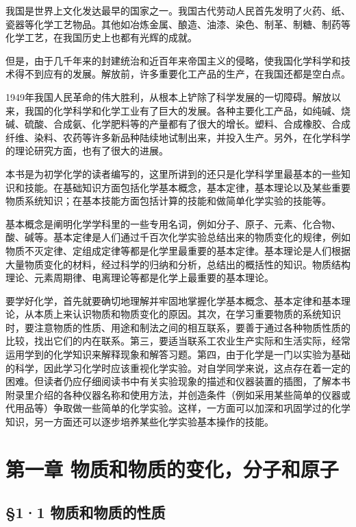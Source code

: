 我国是世界上文化发达最早的国家之一。我国古代劳动人民首先发明了火药、纸、瓷器等化学工艺物品。其他如冶炼金属、酿造、油漆、染色、制革、制糖、制药等化学工艺，在我国历史上也都有光辉的成就。

但是，由于几千年来的封建统治和近百年来帝国主义的侵略，使我国化学科学和技术得不到应有的发展。解放前，许多重要化工产品的生产，在我国还都是空白点。

1949年我国人民革命的伟大胜利，从根本上铲除了科学发展的一切障碍。解放以来，我国的化学科学和化学工业有了巨大的发展。各种主要化工产品，如纯碱、烧碱、硫酸、合成氨、化学肥料等的产量都有了很大的增长。塑料、合成橡胶、合成纤维、染料、农药等许多新品种陆续地试制出来，并投入生产。另外，在化学科学的理论研究方面，也有了很大的进展。

本书是为初学化学的读者编写的，这里所讲到的还只是化学科学里最基本的一些知识和技能。在基础知识方面包括化学基本概念，基本定律，基本理论以及某些重要物质系统知识；在基本技能方面包括计算的技能和做简单化学实验的技能等。

基本概念是阐明化学学科里的一些专用名词，例如分子、原子、元素、化合物、酸、碱等。基本定律是人们通过千百次化学实验总结出来的物质变化的规律，例如物质不灭定律、定组成定律等都是化学里最重要的基本定律。基本理论是人们根据大量物质变化的材料，经过科学的归纳和分析，总结出的概括性的知识。物质结构理论、元素周期律、电离理论等都是化学上最重要的基本理论。

要学好化学，首先就要确切地理解并牢固地掌握化学基本概念、基本定律和基本理论，从本质上来认识物质和物质变化的原因。其次，在学习重要物质的系统知识时，要注意物质的性质、用途和制法之间的相互联系，要善于通过各种物质性质的比较，找出它们的内在联系。第三，要适当联系工农业生产实际和生活实际，经常运用学到的化学知识来解释现象和解答习题。第四，由于化学是一门以实验为基础的科学，因此学习化学时应该重视化学实验。对自学同学来说，这点存在着一定的困难。但读者仍应仔细阅读书中有关实验现象的描述和仪器装置的插图，了解本书附录里介绍的各种仪器名称和使用方法，并创造条件（例如采用某些简单的仪器或代用品等）争取做一些简单的化学实验。这样，一方面可以加深和巩固学过的化学知识，另一方面还可以逐步培养某些化学实验基本操作的技能。

\chapter{第一章 物质和物质的变化，分子和原子}

\section{§1·1 物质和物质的性质}

